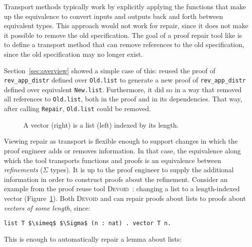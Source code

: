 Transport methods typically work by explicitly applying the functions that make up the equivalence to convert
inputs and outputs back and forth between equivalent types.
This approach would not work for repair, since it does not make it possible to remove the old specification.
The goal of a proof repair tool like \toolname is to define a transport method that
can remove references to the old specification, %
since the old specification may no longer exist.

Section~\ref{sec:overview} showed a simple case of this: \toolname
reused the proof of \lstinline{rev_app_distr} defined over \lstinline{Old.list}
to generate a new proof of \lstinline{rev_app_distr} defined over equivalent \lstinline{New.list}.
Furthermore, it did so in a way that removed all references to \lstinline{Old.list}, both in the proof
and in its dependencies.
That way, after calling \lstinline{Repair}, \lstinline{Old.list} could be removed.

\begin{figure}
\begin{minipage}{0.40\textwidth}
   
\end{minipage}
\hfill
\begin{minipage}{0.58\textwidth}
   
\end{minipage}
\vspace{-0.3cm}
\caption{A vector (right) is a list (left) indexed by its length.}
\label{fig:listtovect}
\end{figure}

Viewing repair as transport is flexible enough to support changes in which the proof engineer adds or removes information.
In that case, the equivalence along which the tool transports functions and proofs
is an equivalence between \textit{refinements} ($\Sigma$ types).
It is up to the proof engineer to supply the additional information in order to construct proofs about the refinement.
Consider an example from the proof reuse tool \textsc{Devoid}~\cite{Ringer2019}:
changing a list to a length-indexed vector (Figure~\ref{fig:listtovect}).
Both \textsc{Devoid} and \toolname can repair proofs about lists to proofs about \textit{vectors of some length}, since:

\begin{lstlisting}
list T $\simeq$ $\Sigma$ (n : nat) . vector T n.
\end{lstlisting}
This is enough to automatically repair a lemma about lists:

